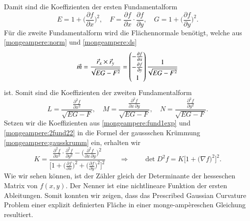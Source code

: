 Damit sind die Koeffizienten der ersten Fundamentalform 
\begin{equation}
  E = 1 + \biggl(\frac{\partial f}{\partial x}\biggr)^2, \quad
  F = \frac{\partial f}{\partial x} \cdot \frac{\partial f}{\partial y}, \quad
  G = 1 + \biggl(\frac{\partial f}{\partial y}\biggr)^2.
  \label{mongeampere:fund1exp}
\end{equation}
Für die zweite Fundamentalform wird die Flächennormale benötigt, welche aus \eqref{mongeampere:norm} und \eqref{mongeampere:ds} 
\begin{equation*}
  \vec m =
\renewcommand{\arraystretch}{1.3}
\frac{\vec r_x \times \vec r_y}{\!\sqrt{EG-F^2}} = \begin{pmatrix}
    -\frac{\partial f}{\partial x} \\
    -\frac{\partial f}{\partial y} \\
    1
  \end{pmatrix}
  \frac{1}{\!\sqrt{EG-F^2}}
\end{equation*}
ist.
Somit sind die Koeffizienten der zweiten Fundamentalform
\begin{equation}
  L = \frac{\displaystyle\frac{\partial^2 f}{\partial x^2}}{\!\sqrt{EG-F}}, \quad
  M = \frac{\displaystyle\frac{\partial^2 f}{\partial x \, \partial y}}{\!\sqrt{EG-F}}, \quad
  N = \frac{\displaystyle\frac{\partial^2 f}{\partial y^2}}{\!\sqrt{EG-F}}.
  \label{mongeampere:2fund22}
\end{equation}
Setzen wir die Koeffizienten aus \eqref{mongeampere:fund1exp} und \eqref{mongeampere:2fund22} in die Formel der gaussschen Krümmung \eqref{mongeampere:gausskrumm}
ein, erhalten wir
\begin{equation}
  K = \frac{
    \displaystyle\frac{\partial^2 f}{\partial x^2} \cdot \displaystyle\frac{\partial^2 f}{\partial y^2} - \biggl(\displaystyle\frac{\partial^2 f}{\partial x \, \partial y} \biggr)^2}
    {\biggl[1 + 
    \biggl(\displaystyle\frac{\partial f}{\partial x}\biggr)^2 +
    \biggl(\displaystyle\frac{\partial f}{\partial y}\biggr)^2\biggr]^2}
\qquad\Rightarrow\qquad
    \det D^2 f = K \bigl[ 1 + 
    \bigl(\nabla f\bigr)^2\bigr]^2.
    \label{mongeampere:pd}
\end{equation}
Wie wir sehen können, ist der Zähler gleich der Determinante der hesseschen Matrix von $f(x,y)$.
Der Nenner ist eine nichtlineare Funktion der ersten Ableitungen.
Somit konnten wir zeigen, dass das Prescribed Gaussian Curvature Problem einer explizit definierten Fläche in einer 
monge-ampèreschen Gleichung resultiert.

